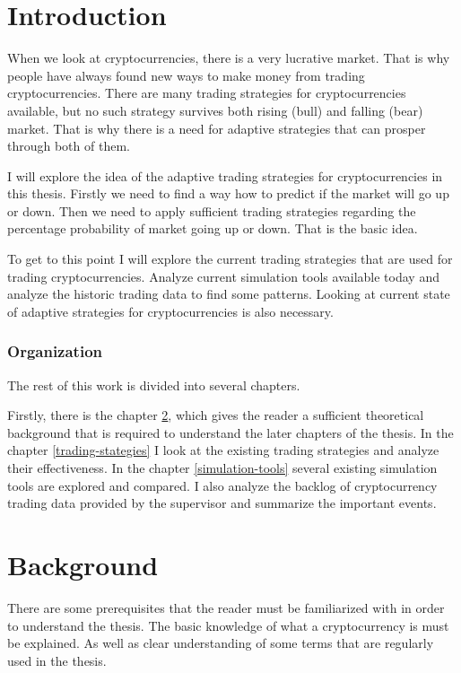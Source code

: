 
\chapter{Introduction}

When we look at cryptocurrencies, there is a very lucrative market. That is why people have always found new ways to make money from trading cryptocurrencies. There are many trading strategies for cryptocurrencies available, but no such strategy survives both rising (bull) and falling (bear) market. That is why there is a need for adaptive strategies that can prosper through both of them.

I will explore the idea of the adaptive trading strategies for cryptocurrencies in this thesis. Firstly we need to find a way how to predict if the market will go up or down. Then we need to apply sufficient trading strategies regarding the percentage probability of market going up or down. That is the basic idea.

To get to this point I will explore the current trading strategies that are used for trading cryptocurrencies. Analyze current simulation tools available today and analyze the historic trading data to find some patterns. Looking at current state of adaptive strategies for cryptocurrencies is also necessary.

\subsection*{Organization}

The rest of this work is divided into several chapters. 

Firstly, there is the chapter \ref{background}, which gives the reader a sufficient theoretical background that is required to understand the later chapters of the thesis. In the chapter \ref{trading-stategies} I look at the existing trading strategies and analyze their effectiveness. In the chapter \ref{simulation-tools} several existing simulation tools are explored and compared. I also analyze the backlog of cryptocurrency trading data provided by the supervisor and summarize the important events.


\chapter{Background}
\label{background}

There are some prerequisites that the reader must be familiarized with in order to understand the thesis. The basic knowledge of what a cryptocurrency is must be explained. As well as clear understanding of some terms that are regularly used in the thesis. 

